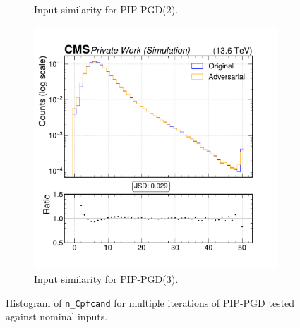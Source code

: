 \begin{figure}[h]
\begin{subfigure}[t]{0.32\textwidth}
    \caption*{Input similarity for PIP-PGD(2).}
  \end{subfigure}\hfill
  \begin{subfigure}[t]{0.32\textwidth}
    \includegraphics[width=\linewidth]{media/output/features/compare/combined_it_3/cmp_global_features_n_Cpfcand.pdf}
    \caption*{Input similarity for PIP-PGD(3).}
  \end{subfigure}

  \caption*{Histogram of \texttt{n\_Cpfcand} for multiple iterations of PIP-PGD tested against nominal inputs.}
  \label{fig:combined_input_n_Cpfcand}
\end{figure}

